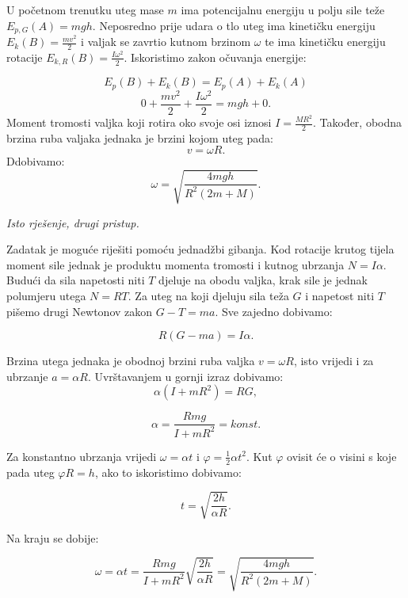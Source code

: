  U početnom trenutku uteg mase $m$ ima potencijalnu energiju u polju sile 
teže $E_{p,G}(A)=mgh$. Neposredno prije udara o tlo uteg ima kinetičku energiju $E_k(B)=\frac{mv^2}{2}$ i valjak se zavrtio 
kutnom brzinom $\omega$ te ima kinetičku energiju rotacije $E_{k,R}(B)=\frac{I\omega^2}{2}$. Iskoristimo zakon očuvanja energije:

$$E_p(B)+E_k(B)=E_p(A)+E_k(A) $$
$$ 0+ \frac{mv^2}{2} + \frac{I\omega^2 }{2}= mgh + 0 .$$
Moment tromosti valjka koji rotira oko svoje osi iznosi $I=\frac{MR^2}{2}$. Također, obodna brzina 
ruba valjaka jednaka je brzini kojom uteg pada:
$$v=\omega R. $$
Ddobivamo:
$$ \omega= \sqrt{\frac{4mgh}{R^2(2m+M)}}. $$


\textit{Isto rješenje, drugi pristup.}

Zadatak je moguće riješiti pomoću jednadžbi gibanja. Kod rotacije krutog tijela moment sile jednak je produktu momenta tromosti i kutnog ubrzanja $N=I\alpha$. Budući da sila napetosti niti $T$ djeluje na obodu valjka, krak sile je jednak polumjeru utega $N=RT$. Za uteg na koji djeluju sila teža $G$ i napetost niti $T$ pišemo drugi Newtonov zakon $G-T=ma$. Sve zajedno dobivamo:

$$R(G-ma)=I\alpha.$$

Brzina utega jednaka je obodnoj brzini ruba valjka  $v=\omega R $, isto vrijedi i za ubrzanje $a=\alpha R$. Uvrštavanjem u gornji izraz dobivamo: 
$$ \alpha(I+mR^2)=RG,$$

$$ \alpha=\frac{Rmg}{I+mR^2}=konst.$$

Za konstantno ubrzanja vrijedi $\omega=\alpha t$ i $\varphi=\frac{1}{2}\alpha t^2 $. Kut $\varphi$ ovisit će o visini s koje pada uteg
$\varphi R=h$, ako to iskoristimo dobivamo:

$$t=\sqrt{\frac{2h}{\alpha R}}. $$

Na kraju se dobije:

$$\omega=\alpha t=\frac{Rmg}{I+mR^2} \sqrt{\frac{2h}{\alpha R}}=  \sqrt{\frac{4mgh}{R^2(2m+M)}}. $$

